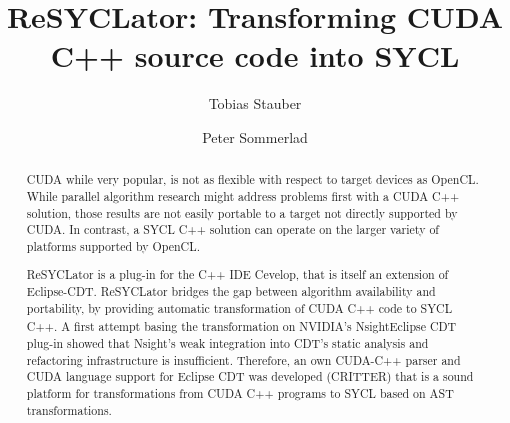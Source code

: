 \documentclass[sigconf]{acmart}
\newcommand{\nvidia}{NVIDIA\textsuperscript{\textregistered}}
\newcommand{\nsight}{Nsight\texttrademark{}}
\begin{document}
%
\title{ReSYCLator: Transforming CUDA C++ source code into SYCL}

%
\author{Tobias Stauber}
\author{Peter Sommerlad}

%

%
\begin{abstract}
CUDA\texttrademark{} while very popular, is not as flexible with respect to target devices as OpenCL\texttrademark{}. 
While parallel algorithm research might address problems first with a CUDA C++ solution, those results are not easily portable to a target not directly supported by CUDA. 
In contrast, a SYCL\texttrademark{} C++ solution can operate on the larger variety of platforms supported by OpenCL.

ReSYCLator is a plug-in for the C++ IDE Cevelop\cite{cevelop}, that is itself an extension of Eclipse-CDT. ReSYCLator bridges the gap between algorithm availability and portability, by providing automatic transformation of CUDA C++ code to SYCL C++. A first attempt basing the transformation on \nvidia's \nsight Eclipse CDT plug-in showed that \nsight's weak integration into CDT's static analysis and refactoring infrastructure is insufficient. Therefore, an own CUDA-C++ parser and CUDA language support for Eclipse CDT was developed (CRITTER) that is a sound platform for transformations from CUDA C++ programs to SYCL based on AST transformations.
\end{abstract}
\end{document}
